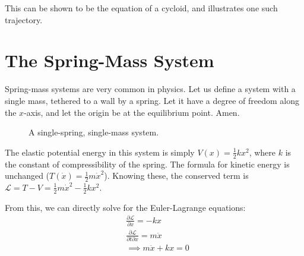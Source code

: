 \documentclass[%
 amsmath,amssymb,
aps,
 fleqn,
 notitlepage,
]{revtex4-2}
\begin{document}
This can be shown to be the equation of a cycloid, and  illustrates one such trajectory.

\section{The Spring-Mass System} %


Spring-mass systems are very common in physics.  Let us define a system with a single mass, tethered to a wall by a spring.  Let it have a degree of freedom along the $x$-axis, and let the origin be at the equilibrium point.  Amen.

\begin{figure}[h!]
    \centering
    \caption{A single-spring, single-mass system.}
\end{figure}

The elastic potential energy in this system is simply $\displaystyle V(x) = \frac12kx^2$, where $k$ is the constant of compressibility of the spring.  The formula for kinetic energy is unchanged ($\displaystyle T(\dot x) = \frac12m\dot x^2$).  Knowing these, the conserved term is $\displaystyle \mathscr L = T - V = \frac12m\dot x^2 - \frac12kx^2$.

From this, we can directly solve for the Euler-Lagrange equations:
\begin{align*}
  &\frac{∂\mathscr L}{∂x} = -kx\\
  &\frac{∂\mathscr L}{∂t∂x} = m\ddot x\\
  &⟹ m\ddot x + kx = 0\\
\end{align*}
\end{document}

